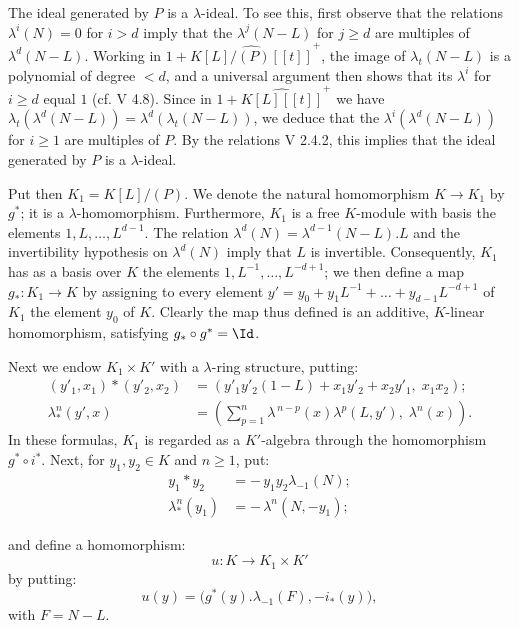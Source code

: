 %
The ideal generated by \(P\) is a \(\lambda\)-ideal. To see this, first observe that the relations \(\lambda^i(N)=0\) for \(i>d\) imply that the \(\lambda^j(N-L)\) for \(j\ge d\) are multiples of \(\lambda^d(N-L)\). Working in \(1+\widehat{K[L]/(P)[[t]]}^+\), the image of \(\lambda_t(N-L)\) is a polynomial of degree \(<d\), and a universal argument then shows that its \(\lambda^i\) for \(i\ge d\) equal \(1\) (cf. V 4.8). Since in \(1+\widehat{K[L][[t]]}^+\) we have \(\lambda_t(\lambda^d(N-L))=\lambda^d(\lambda_t(N-L))\), we deduce that the \(\lambda^i(\lambda^d(N-L))\) for \(i\ge1\) are multiples of \(P\). By the relations V 2.4.2, this implies that the ideal generated by \(P\) is a \(\lambda\)-ideal.

Put then \(K_1=K[L]/(P)\). We denote the natural homomorphism \(K\to K_1\) by \(g^*\); it is a \(\lambda\)-homomorphism. Furthermore, \(K_1\) is a free \(K\)-module with basis the elements \(1,L,\ldots,L^{d-1}\). The relation \(\lambda^d(N)=\lambda^{d-1}(N-L).L\) and the invertibility hypothesis on \(\lambda^d(N)\) imply that \(L\) is invertible. Consequently, \(K_1\) has as a basis over \(K\) the elements \(1,L^{-1},\ldots,L^{-d+1}\); we then define a map \(g_*:K_1\to K\) by assigning to every element \(y'=y_0+y_1L^{-1}+\ldots+y_{d-1}L^{-d+1}\) of \(K_1\) the element \(y_0\) of \(K\). Clearly the map thus defined is an additive, \(K\)-linear homomorphism, satisfying \(g_*\circ g^*=\Id\).

Next we endow \(K_1\times K'\) with a \(\lambda\)-ring structure, putting:
\begin{align}
 (y'_1,x_1)*(y'_2,x_2)
   &=(y'_1y'_2(1-L)+x_1y'_2+x_2y'_1,\; x_1x_2); \tag{4.7.1}\\
 \lambda^n_*(y',x)
   &=\left(\sum_{p=1}^{n}\lambda^{\,n-p}(x)\lambda^p(L,y'),\;
     \lambda^n(x)\right). \tag{4.7.2}
\end{align}
In these formulas, \(K_1\) is regarded as a \(K'\)-algebra through the homomorphism \(g^*\circ i^*\).
Next, for \(y_1,y_2\in K\) and \(n\ge1\), put:
\begin{align}
 y_1*y_2&=-\,y_1y_2\lambda_{-1}(N); \tag{4.7.3}\\
 \lambda^n_*(y_1)&=-\,\lambda^n(N,-y_1); \tag{4.7.4}
\end{align}

%
and define a homomorphism:
\[
  u:K\longrightarrow K_1\times K'
\]
by putting:
\[
  u(y)=\bigl(g^*(y).\lambda_{-1}(F),-i_*(y)\bigr),
\]
with \(F=N-L\).

